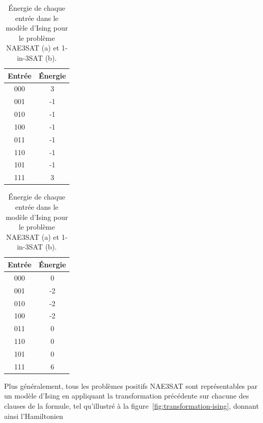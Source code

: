 \begin{table}[h]
    \centering
    \begin{subtable}{0.4\textwidth}
        \centering
        \begin{tabular}{c c}
            \hline
            Entrée & Énergie \\
            \hline
            000 & 3 \\
            001 & -1 \\
            010 & -1 \\
            100 & -1 \\
            011 & -1 \\
            110 & -1 \\
            101 & -1 \\
            111 & 3 \\
            \hline
        \end{tabular}
        \caption{}
        \label{tab:energie-nae3sat}
    \end{subtable}
    \begin{subtable}{0.4\textwidth}
        \centering
        \begin{tabular}{c c}
            \hline
            Entrée & Énergie \\
            \hline
            000 & 0 \\
            001 & -2 \\
            010 & -2 \\
            100 & -2 \\
            011 & 0 \\
            110 & 0 \\
            101 & 0 \\
            111 & 6 \\
            \hline
        \end{tabular}
        \caption{}
        \label{tab:energie-1in3sat}
    \end{subtable}
    \caption{Énergie de chaque entrée dans le modèle d'Ising pour le problème NAE3SAT (a) et 1-in-3SAT (b).}
\end{table}

Plus généralement, tous les problèmes positifs NAE3SAT sont représentables par un modèle d'Ising en appliquant la transformation précédente sur chacune des clauses de la formule, tel qu'illustré à la figure~\ref{fig:transformation-ising}, donnant ainsi l'Hamiltonien 

